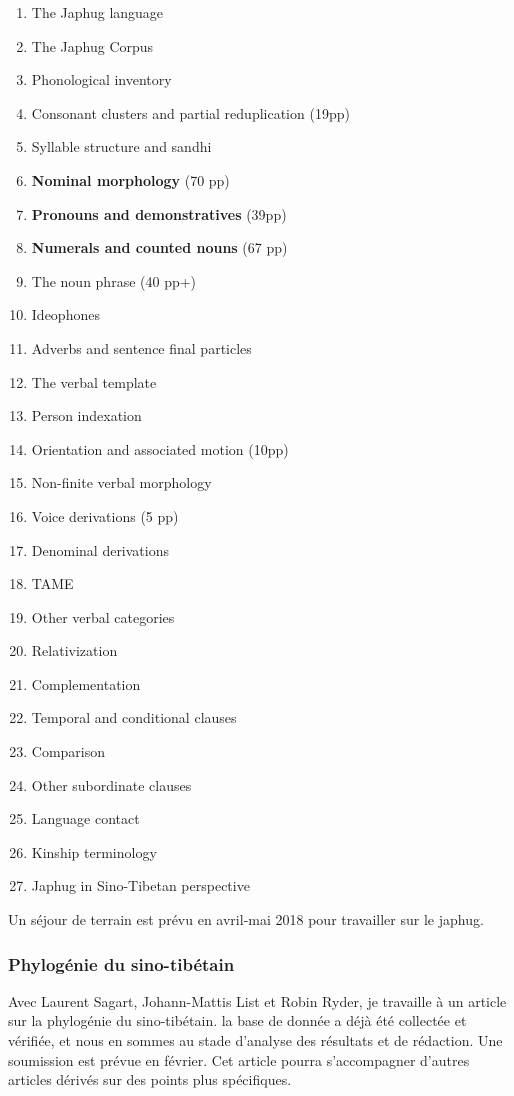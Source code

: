 \documentclass[oldfontcommands,oneside,a4paper,11pt]{article}
\begin{document}
\begin{enumerate}
\item The Japhug language
\item The Japhug Corpus
\item Phonological inventory 
\item Consonant clusters and partial reduplication (19pp)
\item Syllable structure and sandhi
\item \textbf{Nominal morphology} (70 pp)
\item \textbf{Pronouns and demonstratives}  (39pp)
\item \textbf{Numerals and counted nouns} (67 pp)
\item The noun phrase (40 pp+)
\item Ideophones
\item Adverbs and sentence final particles
\item The verbal template
\item Person indexation
\item Orientation and associated motion (10pp)
\item Non-finite verbal morphology
\item Voice derivations (5 pp)
\item Denominal derivations 
\item TAME
\item Other verbal categories
\item Relativization
\item Complementation
\item Temporal and conditional clauses
\item Comparison
\item Other subordinate clauses
\item Language contact
\item Kinship terminology
\item Japhug in Sino-Tibetan perspective
\end{enumerate}


Un séjour de terrain est prévu en avril-mai 2018 pour travailler sur le japhug.

\subsubsection{Phylogénie du sino-tibétain} \label{sec:phylogenie.st}
Avec Laurent Sagart, Johann-Mattis List et Robin Ryder, je travaille à un article sur la phylogénie du sino-tibétain. la base de donnée a déjà été collectée et vérifiée, et nous en sommes au stade d'analyse des résultats et de rédaction. Une soumission est prévue en février. Cet article pourra s'accompagner d'autres articles dérivés sur des points plus spécifiques.
\end{document}
